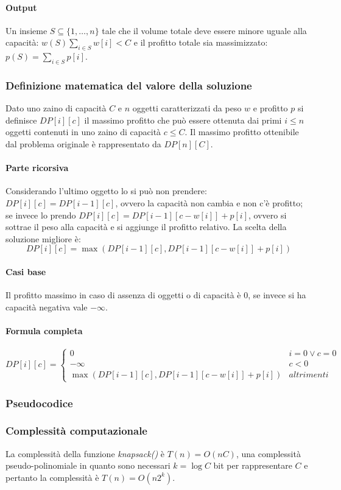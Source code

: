 \paragraph{Output}
Un insieme $S\subseteq\{1,\dots, n\}$ tale che il volume totale deve essere minore uguale alla capacit\`a: $w(S)\sum\limits_{i\in S}w[i]<C$ e il profitto
totale sia massimizzato: $p(S)=\sum\limits_{i\in S}p[i]$.
\subsubsection{Definizione matematica del valore della soluzione}
Dato uno zaino di capacit\`a $C$ e $n$ oggetti caratterizzati da peso $w$ e profitto $p$ si definisce $DP[i][c]$ il massimo profitto che pu\`o essere 
ottenuta dai primi $i\le n$ oggetti contenuti in uno zaino di capacit\`a $c\le C$. Il massimo profitto ottenibile dal problema originale \`e rappresentato
da $DP[n][C]$.
\paragraph{Parte ricorsiva}
Considerando l'ultimo oggetto lo si pu\`o non prendere: $DP[i][c]=DP[i-1][c]$, ovvero la capacit\`a non cambia e non c'\`e profitto; se invece lo prendo
$DP[i][c]=DP[i-1][c-w[i]]+p[i]$, ovvero si sottrae il peso alla capacit\`a e si aggiunge il profitto relativo. La scelta della soluzione migliore \`e:
$$DP[i][c] = \max(DP[i-1][c], DP[i-1][c-w[i]]+p[i])$$
\paragraph{Casi base}
Il profitto massimo in caso di assenza di oggetti o di capacit\`a \`e $0$, se invece si ha capacit\`a negativa vale $-\infty$. 
\paragraph{Formula completa}
$$
DP[i][c] =
\begin{cases}
0\quad & i = 0 \lor c = 0\\
-\infty & c<0\\
\max(DP[i-1][c], DP[i-1][c-w[i]]+p[i]) & altrimenti
\end{cases}
$$
\subsubsection{Pseudocodice}

\subsubsection{Complessit\`a computazionale}
La complessit\`a della funzione \emph{knapsack()} \`e $T(n) = O(nC)$, una complessit\`a pseudo-polinomiale in quanto sono necessari $k = \log C$ bit per 
rappresentare $C$ e pertanto la complessit\`a \`e $T(n) = O(n2^k)$.
